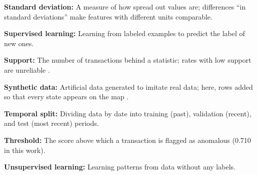 \textbf{Standard deviation:} A measure of how spread out values are; differences ``in standard deviations'' make features with different units comparable.

\textbf{Supervised learning:} Learning from labeled examples to predict the label of new ones.

\textbf{Support:} The number of transactions behind a statistic; rates with low support are unreliable \cite{wainer2007dangerous}.

\textbf{Synthetic data:} Artificial data generated to imitate real data; here, rows added so that every state appears on the map \cite{jordon2022synthetic}.

\textbf{Temporal split:} Dividing data by date into training (past), validation (recent), and test (most recent) periods.

\textbf{Threshold:} The score above which a transaction is flagged as anomalous (0.710 in this work).

\textbf{Unsupervised learning:} Learning patterns from data without any labels.

\endgroup
